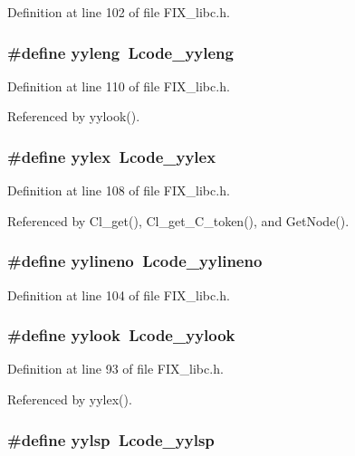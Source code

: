 Definition at line 102 of file FIX\_\-libc.h.
\subsubsection{\setlength{\rightskip}{0pt plus 5cm}\#define \bf{yyleng}~Lcode\_\-yyleng}\label{FIX__libc_8h_fa07a629486cb790560bb95713ec7794}




Definition at line 110 of file FIX\_\-libc.h.

Referenced by yylook().
\subsubsection{\setlength{\rightskip}{0pt plus 5cm}\#define yylex~Lcode\_\-yylex}\label{FIX__libc_8h_5611300548b2030d86b6ab9168132b88}




Definition at line 108 of file FIX\_\-libc.h.

Referenced by Cl\_\-get(), Cl\_\-get\_\-C\_\-token(), and Get\-Node().
\subsubsection{\setlength{\rightskip}{0pt plus 5cm}\#define \bf{yylineno}~Lcode\_\-yylineno}\label{FIX__libc_8h_d71cf0fddcfe4f61de0929105b33226c}




Definition at line 104 of file FIX\_\-libc.h.
\subsubsection{\setlength{\rightskip}{0pt plus 5cm}\#define yylook~Lcode\_\-yylook}\label{FIX__libc_8h_83b49d0e75603403c74595b903c3d2ca}




Definition at line 93 of file FIX\_\-libc.h.

Referenced by yylex().
\subsubsection{\setlength{\rightskip}{0pt plus 5cm}\#define \bf{yylsp}~Lcode\_\-yylsp}\label{FIX__libc_8h_e32aca67dced6cb02908b4bc9042e8d3}





